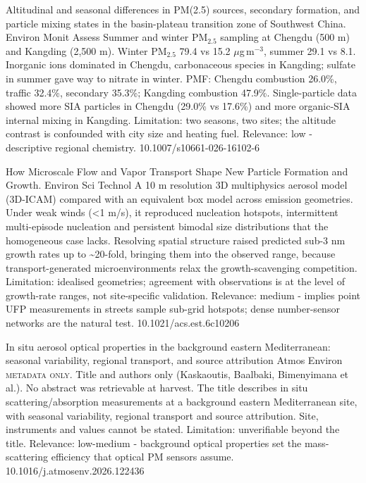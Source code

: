 \documentclass[10pt]{article}
\begin{document}
{Altitudinal and seasonal differences in PM(2.5) sources, secondary formation, and particle mixing states in the basin-plateau transition zone of Southwest China.}
{Environ Monit Assess}
{Summer and winter PM$_{2.5}$ sampling at Chengdu (500 m) and Kangding (2,500 m). Winter PM$_{2.5}$ 79.4 vs 15.2 $\mu$g\,m$^{-3}$, summer 29.1 vs 8.1. Inorganic ions dominated in Chengdu, carbonaceous species in Kangding; sulfate in summer gave way to nitrate in winter. PMF: Chengdu combustion 26.0\%, traffic 32.4\%, secondary 35.3\%; Kangding combustion 47.9\%. Single-particle data showed more SIA particles in Chengdu (29.0\% vs 17.6\%) and more organic-SIA internal mixing in Kangding. Limitation: two seasons, two sites; the altitude contrast is confounded with city size and heating fuel. Relevance: low - descriptive regional chemistry.}
{10.1007/s10661-026-16102-6}

{How Microscale Flow and Vapor Transport Shape New Particle Formation and Growth.}
{Environ Sci Technol}
{A 10 m resolution 3D multiphysics aerosol model (3D-ICAM) compared with an equivalent box model across emission geometries. Under weak winds (<1 m/s), it reproduced nucleation hotspots, intermittent multi-episode nucleation and persistent bimodal size distributions that the homogeneous case lacks. Resolving spatial structure raised predicted sub-3 nm growth rates up to \textasciitilde{}20-fold, bringing them into the observed range, because transport-generated microenvironments relax the growth-scavenging competition. Limitation: idealised geometries; agreement with observations is at the level of growth-rate ranges, not site-specific validation. Relevance: medium - implies point UFP measurements in streets sample sub-grid hotspots; dense number-sensor networks are the natural test.}
{10.1021/acs.est.6c10206}

{In situ aerosol optical properties in the background eastern Mediterranean: seasonal variability, regional transport, and source attribution}
{Atmos Environ}
{\textsc{metadata only.} Title and authors only (Kaskaoutis, Baalbaki, Bimenyimana et al.). No abstract was retrievable at harvest. The title describes in situ scattering/absorption measurements at a background eastern Mediterranean site, with seasonal variability, regional transport and source attribution. Site, instruments and values cannot be stated. Limitation: unverifiable beyond the title. Relevance: low-medium - background optical properties set the mass-scattering efficiency that optical PM sensors assume.}
{10.1016/j.atmosenv.2026.122436}
\end{document}
